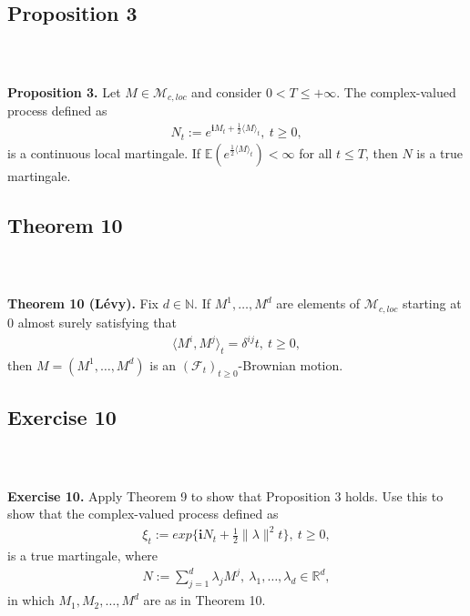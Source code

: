 \documentclass{beamer}
\numberwithin{equation}{section}
\newenvironment{frame2}{\begin{frame}\frametitle{{\normalsize \secname} \\ {\large \subsecname}}}{\end{frame}}
\begin{document}
\subsection{Proposition 3}

\begin{frame2}
    \textbf{Proposition 3.}
    Let $M \in \mathcal{M}_{c,loc}$ and consider $0 < T \leq + \infty$.
    The complex-valued process defined as
    \begin{align}
        N_t := e^{\textbf{i}M_t + \frac{1}{2}\langle M \rangle_t}, \ t \geq 0,
    \end{align}
    is a continuous local martingale.
    If $\mathbb{E}\left(e^{\frac{1}{2}\langle M \rangle_t}\right) < \infty$ for all $t \leq T$, then $N$ is a true martingale.
\end{frame2}

\subsection{Theorem 10}

\begin{frame2}
    \textbf{Theorem 10 (Lévy).}
    Fix $d \in \mathbb{N}$.
    If $M^1,\ldots,M^d$ are elements of $\mathcal{M}_{c,loc}$ starting at 0 almost surely satisfying that
    \begin{align}
        \langle M^i,M^j \rangle_t = \delta^{ij}t, \ t \geq 0,
    \end{align}
    then $M = (M^1, \ldots, M^d)$ is an $(\mathcal{F}_t)_{t \geq 0}$-Brownian motion.
\end{frame2}

\subsection{Exercise 10}

\begin{frame2}
    \textbf{Exercise 10.}
    Apply Theorem 9 to show that Proposition 3 holds.
    Use this to show that the complex-valued process defined as
    \begin{align}
        \xi_t := exp\{ \textbf{i}N_t + \frac{1}{2}\| \lambda \|^2 t \}, \ t \geq 0,
    \end{align}
    is a true martingale, where
    \begin{align}
        N := \sum_{j = 1}^d \lambda_j M^j, \ \lambda_1,\ldots,\lambda_d \in \mathbb{R}^d,
    \end{align}
    in which $M_1, M_2, \ldots, M^d$ are as in Theorem 10.
\end{frame2}
\end{document}
